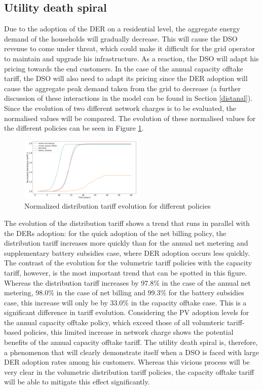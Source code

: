 \subsection{Utility death spiral}
Due to the adoption of the DER on a residential level, the aggregate energy demand of the households will gradually decrease. This will cause the DSO revenue to come under threat, which could make it difficult for the grid operator to maintain and upgrade his infrastructure. As a reaction, the DSO will adapt his pricing towards the end customers. In the case of the annual capacity offtake tariff, the DSO will also need to adapt its pricing since the DER adoption will cause the aggregate peak demand taken from the grid to decrease (a further discussion of these interactions in the model can be found in Section \ref{distanal}). Since the evolution of two different network charges is to be evaluated, the normalised values will be compared. The evolution of these normalised values for the different policies can be seen in Figure \ref{Figure:distpol}. 
\begin{figure}[h!]
\centering
\includegraphics[width=6cm]{Policies/Dist.png}
\caption{Normalized distribution tariff evolution for different policies}
\label{Figure:distpol}
\end{figure}
\noindent
The evolution of the distribution tariff shows a trend that runs in parallel with the DERs adoption: for the quick adoption of the net billing policy, the distribution tariff increases more quickly than for the annual net metering and supplementary battery subsidies case, where DER adoption occurs less quickly. The contrast of the evolution for the volumetric tariff policies with the capacity tariff, however, is the most important trend that can be spotted in this figure. Whereas the distribution tariff increases by  97.8\% in the case of the annual net metering, 98.0\% in the case of net billing and 99.3\% for the battery subsidies case, this increase will only be by 33.0\% in the capacity offtake case. This is a significant difference in tariff evolution. Considering the PV adoption levels for the annual capacity offtake policy, which exceed those of all volumteric tariff-based policies, this limited increase in network charge shows the potential benefits of the annual capacity offtake tariff. 
\newline \newline \noindent
The utility death spiral is, therefore, a phenomenon that will clearly demonstrate itself when a DSO is faced with large DER adoption rates among his customers. Whereas this vicious process will be very clear in the volumetric distribution tariff policies, the capacity offtake tariff will be able to mitigate this effect significantly. 
